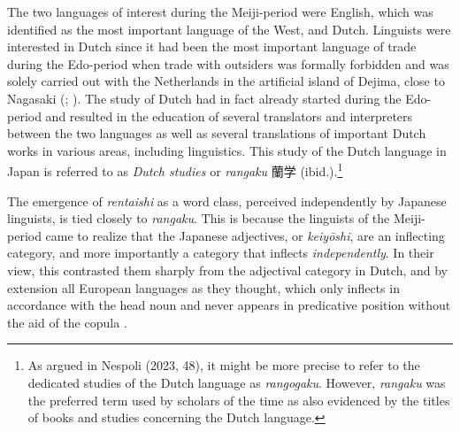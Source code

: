 \documentclass[output=paper]{langscibook}
\begin{document}
The two languages of interest during the Meiji-period were English, which was identified as the most important language of the West, and Dutch. Linguists were interested in Dutch since it had been the most important language of trade during the Edo-period when trade with outsiders was formally forbidden and was solely carried out with the Netherlands in the artificial island of Dejima, close to Nagasaki (\citealt{Sugimoto1967,Sugimoto1991}; \citealt{Nespoli2023}). The study of Dutch had in fact already started during the Edo-period and resulted in the education of several translators and interpreters between the two languages as well as several translations of important Dutch works in various areas, including linguistics. This study of the Dutch language in Japan is referred to as \textit{Dutch studies} or \textit{rangaku} 蘭学 (ibid.).\footnote{As argued in Nespoli (2023, 48), it might be more precise to refer to the dedicated studies of the Dutch language as \textit{rangogaku}. However, \textit{rangaku} was the preferred term used by scholars of the time as also evidenced by the titles of books and studies concerning the Dutch language.}

The emergence of \textit{rentaishi} as a word class, perceived independently by Japanese linguists, is tied closely to \textit{rangaku}. This is because the linguists of the Meiji-period came to realize that the Japanese adjectives, or \textit{keiyōshi}, are an inflecting category, and more importantly a category that inflects \textit{independently}. In their view, this contrasted them sharply from the adjectival category in Dutch, and by extension all European languages as they thought, which only inflects in accordance with the head noun and never appears in predicative position without the aid of the copula \citep{Kim2006}.
\end{document}
